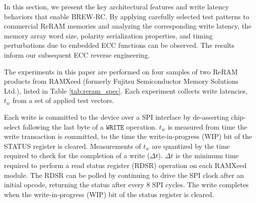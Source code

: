 In this section, we present the key architectural features and write latency behaviors that enable BREW-RC. 
By applying carefully selected test patterns to commercial ReRAM memories and analyzing the corresponding write latency, the memory array word size, polarity serialization properties, and timing perturbations due to embedded ECC functions can be observed. 
The results inform our subsequent ECC reverse engineering.

The experiments in this paper are performed on four samples of two ReRAM products from RAMXeed (formerly Fujitsu Semiconductor Memory Solutions Ltd.), listed in Table \ref{tab:reram_spec}.
Each experiment collects write latencies, $t_w$ from a set of applied test vectors.

Each write is committed to the device over a SPI interface by de-asserting chip-select following the last byte of a $\texttt{WRITE}$ operation. $t_w$ is measured from time the write transaction is committed, to the time the write-in-progress (WIP) bit of the STATUS register is cleared. Measurements of $t_w$ are quantized by the time required to check for the completion of a write ($\Delta t$). 
$\Delta t$ is the minimum time required to perform a read status register (RDSR) operation on each RAMXeed module. The RDSR can be polled by continuing to drive the SPI clock after an initial opcode, returning the status after every 8 SPI cycles.
The write completes when the write-in-progress (WIP) bit of the status register is cleared.

